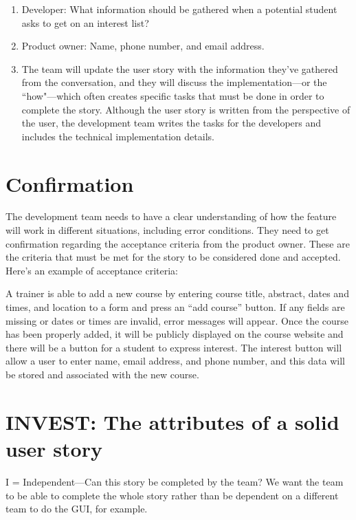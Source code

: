 \begin{enumerate}
    \item Developer: What information should be gathered when a potential student asks to get on an interest list?

    \item Product owner: Name, phone number, and email address.

    \item The team will update the user story with the information they've gathered from the conversation, and they will discuss the implementation—or the “how"—which often creates specific tasks that must be done in order to complete the story. Although the user story is written from the perspective of the user, the development team writes the tasks for the developers and includes the technical implementation details.
\end{enumerate}

\section{Confirmation}

The development team needs to have a clear understanding of how the feature will work in different situations, including error conditions. They need to get confirmation regarding the acceptance criteria from the product owner. These are the criteria that must be met for the story to be considered done and accepted. Here's an example of acceptance criteria:

A trainer is able to add a new course by entering course title, abstract, dates and times, and location to a form and press an “add course” button.
If any fields are missing or dates or times are invalid, error messages will appear.
Once the course has been properly added, it will be publicly displayed on the course website and there will be a button for a student to express interest.
The interest button will allow a user to enter name, email address, and phone number, and this data will be stored and associated with the new course.
 
\section{INVEST: The attributes of a solid user story}


I = Independent—Can this story be completed by the team? We want the team to be able to complete the whole story rather than be dependent on a different team to do the GUI, for example.


